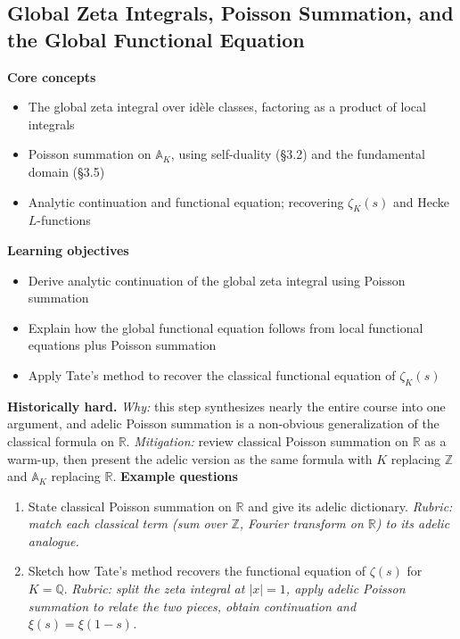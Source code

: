 \documentclass[11pt]{article}
\newcommand{\Q}{\mathbb{Q}}
\newcommand{\Z}{\mathbb{Z}}
\newcommand{\A}{\mathbb{A}}
\begin{document}
\subsection{Global Zeta Integrals, Poisson Summation, and the Global Functional Equation}
\textbf{Core concepts}
\begin{itemize}[noitemsep]
  \item The global zeta integral over idèle classes, factoring as a product of local integrals
  \item Poisson summation on $\A_K$, using self-duality (\S3.2) and the fundamental domain (\S3.5)
  \item Analytic continuation and functional equation; recovering $\zeta_K(s)$ and Hecke $L$-functions
\end{itemize}
\textbf{Learning objectives}
\begin{itemize}[noitemsep]
  \item Derive analytic continuation of the global zeta integral using Poisson summation
  \item Explain how the global functional equation follows from local functional equations plus Poisson summation
  \item Apply Tate's method to recover the classical functional equation of $\zeta_K(s)$
\end{itemize}
\textbf{Historically hard.} \emph{Why:} this step synthesizes nearly the entire course into one argument, and adelic Poisson summation is a non-obvious generalization of the classical formula on $\mathbb{R}$. \emph{Mitigation:} review classical Poisson summation on $\mathbb{R}$ as a warm-up, then present the adelic version as the same formula with $K$ replacing $\Z$ and $\A_K$ replacing $\mathbb{R}$.
\textbf{Example questions}
\begin{enumerate}[noitemsep]
  \item[Q1 (foundational).] State classical Poisson summation on $\mathbb{R}$ and give its adelic dictionary. \emph{Rubric: match each classical term (sum over $\Z$, Fourier transform on $\mathbb R$) to its adelic analogue.}
  \item[Q2 (advanced).] Sketch how Tate's method recovers the functional equation of $\zeta(s)$ for $K=\Q$. \emph{Rubric: split the zeta integral at $|x|=1$, apply adelic Poisson summation to relate the two pieces, obtain continuation and $\xi(s)=\xi(1-s)$.}
\end{enumerate}

\end{document}
